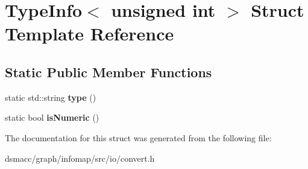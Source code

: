 \hypertarget{structTypeInfo_3_01unsigned_01int_01_4}{}\section{Type\+Info$<$ unsigned int $>$ Struct Template Reference}
\label{structTypeInfo_3_01unsigned_01int_01_4}
\subsection*{Static Public Member Functions}
\begin{DoxyCompactItemize}
\item 
\mbox{\label{structTypeInfo_3_01unsigned_01int_01_4_ab6535fea1c025d7921da79e63a40dfbc}} 
static std\+::string {\bfseries type} ()
\item 
\mbox{\label{structTypeInfo_3_01unsigned_01int_01_4_add642325cf7df538656cfa501e28d883}} 
static bool {\bfseries is\+Numeric} ()
\end{DoxyCompactItemize}


The documentation for this struct was generated from the following file\+:\begin{DoxyCompactItemize}
\item 
dsmacc/graph/infomap/src/io/convert.\+h\end{DoxyCompactItemize}
